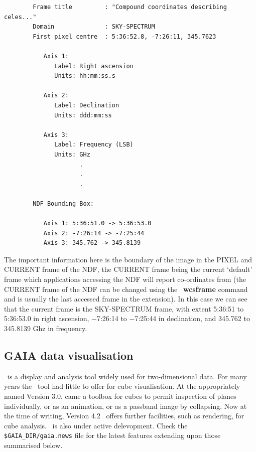 \documentclass[twoside,11pt]{article}
\newcommand{\xref}[3]{#1}
\newcommand{\xlabel}[1]{}
\begin{document}
{\begin{verbatim}
        Frame title         : "Compound coordinates describing celes..."
        Domain              : SKY-SPECTRUM
        First pixel centre  : 5:36:52.8, -7:26:11, 345.7623

           Axis 1:
              Label: Right ascension
              Units: hh:mm:ss.s

           Axis 2:
              Label: Declination
              Units: ddd:mm:ss

           Axis 3:
              Label: Frequency (LSB)
              Units: GHz
                     .
                     .
                     .

        NDF Bounding Box:

           Axis 1: 5:36:51.0 -> 5:36:53.0
           Axis 2: -7:26:14 -> -7:25:44
           Axis 3: 345.762 -> 345.8139

\end{verbatim}\normalsize

The important information here is the boundary of the image in the
PIXEL and CURRENT frame of the NDF, the CURRENT frame being the
current `default' frame which applications accessing the NDF will
report co-ordinates from (the CURRENT frame of the NDF can be changed
using the \KAPPA\ \xref{{\bf wcsframe}}{sun95}{WCSFRAME} command and is
usually the last accessed frame in the extension).  In this case we can
see that the current frame is the SKY-SPECTRUM frame, with extent
5:36:51 to 5:36:53.0 in right ascension, $-$7:26:14 to $-$7:25:44 in
declination, and 345.762 to 345.8139 Ghz in frequency.


\newpage
\subsection{\xlabel{sc16_gaia}GAIA data visualisation\label{sc16_gaia}}

\GAIAref\ is a display and analysis tool widely used for
two-dimensional data.  For many years the \GAIA\ tool had little to
offer for cube visualisation.  At the appropriately named Version 3.0,
came a toolbox for cubes to permit inspection of planes individually,
or as an animation, or as a passband image by collapsing.  Now at the
time of writing, Version 4.2 \GAIA\ offers further facilities, such as 
rendering, for cube analysis.  \GAIA\ is also under active delevopment.
Check the {\tt \$GAIA\_DIR/gaia.news} file for the latest features
extending upon those summarised below.

}
\end{document}

